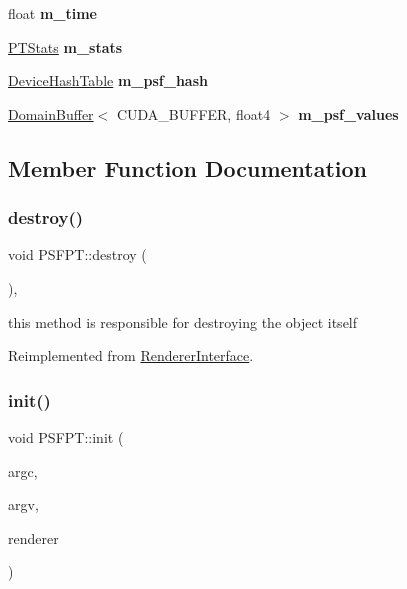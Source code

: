 \begin{DoxyCompactItemize}
float {\bfseries m\+\_\+time}
\item 
\mbox{\label{struct_p_s_f_p_t_a3d7b8da71a544a775cd7cef59281e16c}} 
\hyperlink{struct_p_t_stats}{P\+T\+Stats} {\bfseries m\+\_\+stats}
\item 
\mbox{\label{struct_p_s_f_p_t_ab1e484880753fd1d71814946a191f591}} 
\hyperlink{struct_device_hash_table}{Device\+Hash\+Table} {\bfseries m\+\_\+psf\+\_\+hash}
\item 
\mbox{\label{struct_p_s_f_p_t_ac5ada871265e70dbd367bf87cbad758c}} 
\hyperlink{class_domain_buffer}{Domain\+Buffer}$<$ C\+U\+D\+A\+\_\+\+B\+U\+F\+F\+ER, float4 $>$ {\bfseries m\+\_\+psf\+\_\+values}
\end{DoxyCompactItemize}


\subsection{Member Function Documentation}
\mbox{\label{struct_p_s_f_p_t_ad22588eeea40701d2af23513262a08bd}} 
\subsubsection{\texorpdfstring{destroy()}{destroy()}}
{\footnotesize\ttfamily void P\+S\+F\+P\+T\+::destroy (\begin{DoxyParamCaption}{ }\end{DoxyParamCaption})\hspace{0.3cm}{\ttfamily [inline]}, {\ttfamily [virtual]}}

this method is responsible for destroying the object itself 

Reimplemented from \hyperlink{struct_renderer_interface_a7469218aafa029a3e22bac2c00dca9f5}{Renderer\+Interface}.

\mbox{\label{struct_p_s_f_p_t_ad44f7f2769bcae6881eebf04a99f57ef}} 
\subsubsection{\texorpdfstring{init()}{init()}}
{\footnotesize\ttfamily void P\+S\+F\+P\+T\+::init (\begin{DoxyParamCaption}\item[{int}]{argc,  }\item[{char $\ast$$\ast$}]{argv,  }\item[{\hyperlink{struct_rendering_context}{Rendering\+Context} \&}]{renderer }\end{DoxyParamCaption})\hspace{0.3cm}{\ttfamily [virtual]}}


